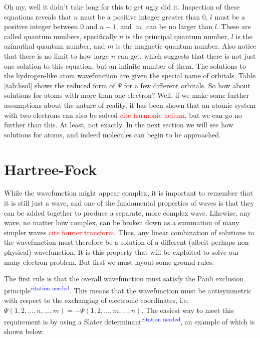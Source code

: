 \documentclass[12pt]{report}
\newcommand{\notetodylan}[1]{\textcolor{red}{#1}} %
\newcommand{\citethis}{\textsuperscript{\textcolor{blue}{citation needed}}} %
\begin{document}
Oh my, well it didn't take long for this to get ugly did it. Inspection of these equations reveals that $n$ must be a positive integer greater than 0, $l$ must be a positive integer between 0 and $n-1$, and $|m|$ can be no larger than $l$. These are called quantum numbers, specifically $n$ is the principal quantum number, $l$ is the azimuthal quantum number, and $m$ is the magnetic quantum number. Also notice that there is no limit to how large $n$ can get, which suggests that there is not just one solution to this equation, but an infinite number of them. The solutions to the hydrogen-like atom wavefunction are given the special name of orbitals. Table \ref{tab:hsol} shows the reduced form of $\Psi$ for a few different orbitals. So how about solutions for atoms with more than one electron? Well, if we make some further assumptions about the nature of reality, it has been shown that an atomic system with two electrons can also be solved \notetodylan{cite harmonic helium}, but we can go no further than this. At least, not exactly. In the next section we will see how solutions for atoms, and indeed molecules can begin to be approached.

\section{Hartree-Fock}
\label{sec:hartree_fock}
While the wavefunction might appear complex, it is important to remember that it is still just a wave, and one of the fundamental properties of waves is that they can be added together to produce a separate, more complex wave. Likewise, any wave, no matter how complex, can be broken down as a summation of many simpler waves \notetodylan{cite fourier transform}. Thus, any linear combination of solutions to the wavefunction must therefore be a solution of a different (albeit perhaps non-physical) wavefunction. It is this property that will be exploited to solve our many electron problem. But first we must layout some ground rules.

The first rule is that the overall wavefunction must satisfy the Pauli exclusion principle\citethis. This means that the wavefunction must be antisymmetric with respect to the exchanging of electronic coordinates, i.e. $\Psi(1, 2,\ldots, n,\ldots,m) = -\Psi(1, 2,\ldots, m,\ldots,n)$. The easiest way to meet this requirement is by using a Slater determinant\citethis, an example of which is shown below.
\end{document}

